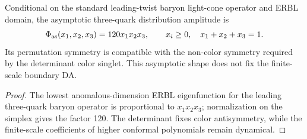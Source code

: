 \documentclass[12pt,a4paper]{article}
\begin{document}
\begin{theorem}
\label{p11:thm:asymptotic-determinant-baryon-da}

Conditional on the standard leading-twist baryon light-cone operator and ERBL domain, the asymptotic three-quark distribution amplitude is
\[
\Phi_{\rm as}(x_1,x_2,x_3)=120x_1x_2x_3,
\qquad x_i\ge0,\quad x_1+x_2+x_3=1.
\]
Its permutation symmetry is compatible with the non-color symmetry required by the determinant color singlet.  This asymptotic shape does not fix the finite-scale boundary DA.
\label{p11:eq:asymptotic-baryon-da}
\label{p11:eq:asymptotic-baryon-da-moments}
\label{p11:eq:asymptotic-baryon-da-low-moments}
\end{theorem}
\begin{proof}

The lowest anomalous-dimension ERBL eigenfunction for the leading three-quark baryon operator is proportional to \(x_1x_2x_3\); normalization on the simplex gives the factor 120.  The determinant fixes color antisymmetry, while the finite-scale coefficients of higher conformal polynomials remain dynamical.
\end{proof}
\end{document}
